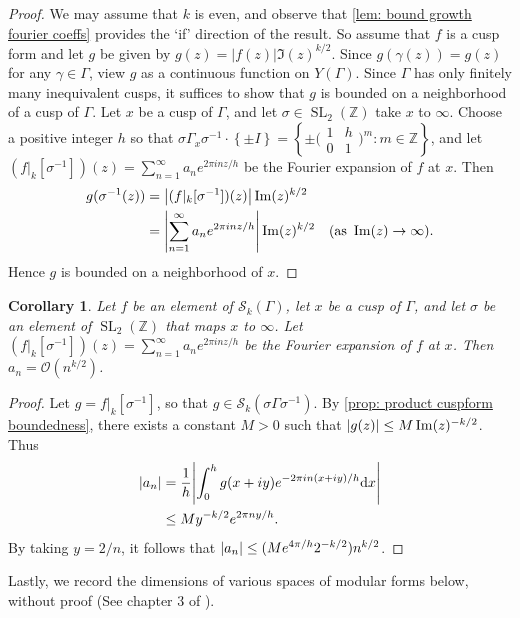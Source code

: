 \documentclass[10pt,leqno,twoside]{article}
\theoremstyle{plain}
\newtheorem{corollary}[lem]{Corollary}
\theoremstyle{definition}
\numberwithin{equation}{section}
\numberwithin{lem}{section}
\newcommand{\cbr}[1]{\left\{#1\right\}}
\DeclareMathOperator{\SL}{SL}
\newcommand{\slz}{\SL_2(\mathbb{Z})}
\begin{document}
\begin{proof}
    We may assume that $k$ is even, and observe that \cref{lem: bound growth fourier coeffs} provides the `if' direction of the result. So assume that $f$ is a cusp form and let $g$ be given by $g(z) = |f(z)|\Im(z)^{k/2}$. Since $g(\gamma(z)) = g(z)$ for any $\gamma\in\varGamma$, view $g$ as a continuous function on $Y(\varGamma)$. Since $\varGamma$ has only finitely many inequivalent cusps, it suffices to show that $g$ is bounded on a neighborhood of a cusp of $\varGamma$. Let $x$ be a cusp of $\varGamma$, and let $\sigma\in\slz$ take $x$ to $\infty$. Choose a positive integer $h$ so that $\sigma\varGamma_x\sigma^{-1}\cdot\cbr{\pm I} = \cbr{\pm\big(\!\begin{smallmatrix}
        1 & h \\ 0 & 1
    \end{smallmatrix}\!\big)^m : m\in\mathbb Z}$, and let $(f|_k[\sigma^{-1}])(z) = \sum_{n=1}^\infty a_ne^{2\pi i nz /h}$ be the Fourier expansion of $f$ at $x$. Then \begin{align*}
        g(\sigma^{-1}(z)) &= \abs{(f|_k[\sigma^{-1}])(z)}\Im(z)^{k/2}\\
        &= \abs{\sum_{n=1}^\infty a_ne^{2\pi i n z/h}}\Im(z)^{k/2}\quad (\text{as }\Im(z)\to\infty).
    \end{align*} Hence $g$ is bounded on a neighborhood of $x$.
\end{proof}
\begin{corollary}\label{cor: cuspform growth corollary}
    Let $f$ be an element of $\mathcal S_k(\varGamma)$, let $x$ be a cusp of $\varGamma$, and let $\sigma$ be an element of $\slz$ that maps $x$ to $\infty$. Let $(f|_k[\sigma^{-1}])(z) = \sum_{n=1}^\infty a_ne^{2\pi i nz /h}$ be the Fourier expansion of $f$ at $x$. Then $a_n = \mathcal O(n^{k/2})$.
\end{corollary}
\begin{proof}
    Let $g = f|_k[\sigma^{-1}]$, so that $g\in\mathcal S_k(\sigma\varGamma\sigma^{-1})$. By \cref{prop: product cuspform boundedness}, there exists a constant $M>0$ such that $\abs{g(z)}\leq M\Im(z)^{-k/2}$. Thus 
    \begin{align*}
        |a_n| &= \frac{1}{h}\abs{\int_0^h g(x+iy)e^{-2\pi i n(x+iy)/h}\dd x}\\
        &\leq My^{-k/2}e^{2\pi n y/h}.
    \end{align*}
    By taking $y = 2/n$, it follows that $\abs{a_n}\leq (Me^{4\pi /h}2^{-k/2})n^{k/2}$.
\end{proof}
Lastly, we record the dimensions of various spaces of modular forms below, without proof (See chapter 3 of \cite{diamond}).
\end{document}
